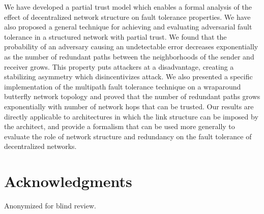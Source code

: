 \documentclass{sig-alternate-05-2015}
\begin{document}
We have developed a partial trust model which enables a formal analysis
of the effect of decentralized network structure on fault tolerance properties.
We have also proposed a general technique for achieving and evaluating adversarial
fault tolerance in a structured network with partial trust.
We found that the probability of an adversary causing an undetectable error
decreases exponentially as the number of redundant paths between the
neighborhoods of the sender and receiver grows.
This property puts attackers at a disadvantage, creating a stabilizing
asymmetry which disincentivizes attack.
We also presented a specific implementation of the multipath fault tolerance
technique on a wraparound butterfly network topology and proved that the
number of redundant paths grows exponentially with number of network hops
that can be trusted.
Our results are directly applicable to architectures in which the link structure
can be imposed by the architect,
and provide a formalism that can be used more generally to evaluate the role
of network structure and redundancy on the fault tolerance of decentralized
networks.

\section{Acknowledgments}
Anonymized for blind review.

%

%
%
%
\end{document}
